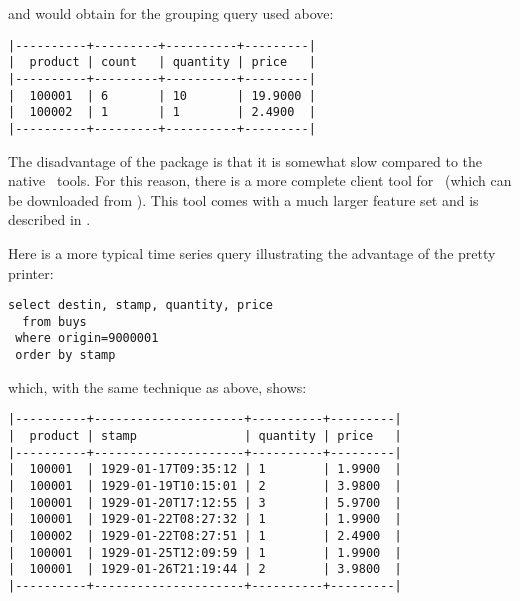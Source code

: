 
and would obtain for the grouping query used above:

\begin{minipage}{\textwidth}
\begin{verbatim}
|----------+---------+----------+---------|
|  product | count   | quantity | price   |
|----------+---------+----------+---------|
|  100001  | 6       | 10       | 19.9000 |
|  100002  | 1       | 1        | 2.4900  |
|----------+---------+----------+---------|
\end{verbatim}
\end{minipage}

The disadvantage of the  package is that
it is somewhat slow compared to the native \nowdb\ tools.
For this reason, there is a more complete client tool
for \nowdb\ (which can be downloaded from ).
This tool comes with a much larger feature set
and is described in .

Here is a more typical time series query illustrating
the advantage of the pretty printer:

\begin{sqlcode}
\begin{lstlisting}
select destin, stamp, quantity, price
  from buys
 where origin=9000001 
 order by stamp
\end{lstlisting}
\end{sqlcode}

\begin{minipage}{\textwidth}
which, with the same technique as above, shows:
\begin{verbatim}
|----------+---------------------+----------+---------|
|  product | stamp               | quantity | price   |
|----------+---------------------+----------+---------|
|  100001  | 1929-01-17T09:35:12 | 1        | 1.9900  |
|  100001  | 1929-01-19T10:15:01 | 2        | 3.9800  |
|  100001  | 1929-01-20T17:12:55 | 3        | 5.9700  |
|  100001  | 1929-01-22T08:27:32 | 1        | 1.9900  |
|  100002  | 1929-01-22T08:27:51 | 1        | 2.4900  |
|  100001  | 1929-01-25T12:09:59 | 1        | 1.9900  |
|  100001  | 1929-01-26T21:19:44 | 2        | 3.9800  |
|----------+---------------------+----------+---------|
\end{verbatim}
\end{minipage}

